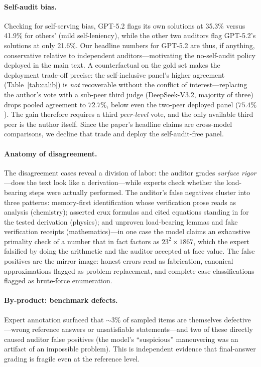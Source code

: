 \paragraph{Self-audit bias.}
Checking for self-serving bias, GPT-5.2 flags its own solutions at 35.3\% versus 41.9\% for others' (mild self-leniency), while the other two auditors flag GPT-5.2's solutions at only 21.6\%. Our headline numbers for GPT-5.2 are thus, if anything, conservative relative to independent auditors---motivating the no-self-audit policy deployed in the main text. A counterfactual on the gold set makes the deployment trade-off precise: the self-inclusive panel's higher agreement (Table~\ref{tab:calib}) is \emph{not} recoverable without the conflict of interest---replacing the author's vote with a sub-peer third judge (DeepSeek-V3.2, majority of three) drops pooled agreement to $72.7\%$, below even the two-peer deployed panel ($75.4\%$). The gain therefore requires a third \emph{peer-level} vote, and the only available third peer is the author itself. Since the paper's headline claims are cross-model comparisons, we decline that trade and deploy the self-audit-free panel.

\paragraph{Anatomy of disagreement.}
The disagreement cases reveal a division of labor: the auditor grades \emph{surface rigor}---does the text look like a derivation---while experts check whether the load-bearing steps were actually performed. The auditor's false negatives cluster into three patterns: memory-first identification whose verification prose reads as analysis (chemistry); asserted crux formulas and cited equations standing in for the tested derivation (physics); and unproven load-bearing lemmas and fake verification receipts (mathematics)---in one case the model claims an exhaustive primality check of a number that in fact factors as $23^{2}\times 1867$, which the expert falsified by doing the arithmetic and the auditor accepted at face value. The false positives are the mirror image: honest errors read as fabrication, canonical approximations flagged as problem-replacement, and complete case classifications flagged as brute-force enumeration.

\paragraph{By-product: benchmark defects.}
Expert annotation surfaced that ${\sim}3\%$ of sampled items are themselves defective---wrong reference answers or unsatisfiable statements---and two of these directly caused auditor false positives (the model's ``suspicious'' maneuvering was an artifact of an impossible problem). This is independent evidence that final-answer grading is fragile even at the reference level.

